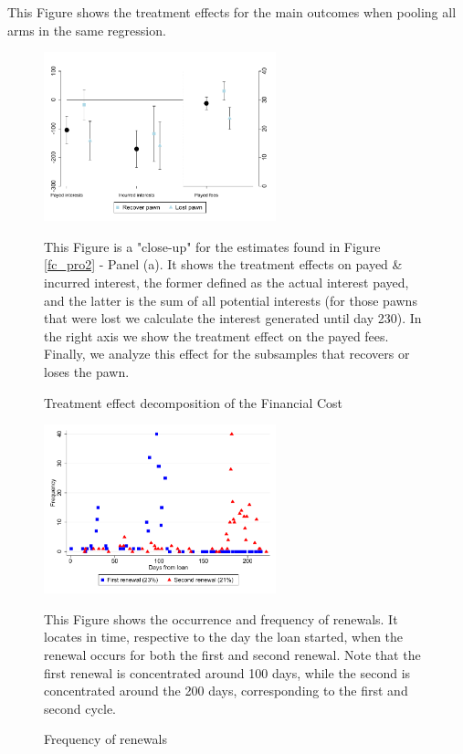 \documentclass[oneside,11pt]{article}
\begin{document}
\scriptsize {
\noindent This Figure shows the treatment effects for the main outcomes when pooling all arms in the same regression.
}

\begin{figure}[H]
        \caption{Treatment effect decomposition of the Financial Cost }
    \label{reg_int_pro_2}
    \begin{center}
        \centering
        \includegraphics[width=0.60\textwidth]{Figuras/int_te_pro_2.pdf}
    \end{center}
     \scriptsize This Figure is a "close-up" for the estimates found in Figure \ref{fc_pro2} - Panel (a). It shows the treatment effects on payed \& incurred interest, the former defined as the actual interest payed, and the latter is the sum of all potential interests (for those pawns that were lost we calculate the interest generated until day 230). In the right axis we show the treatment effect on the payed fees. Finally, we analyze this effect for the subsamples that recovers or loses the pawn.
\end{figure}


\begin{figure}[H]
        \caption{Frequency of renewals}
    \label{ref_dist}
    \begin{center}
        \centering
        \includegraphics[width=0.60\textwidth]{Figuras/ref_dist.pdf}
    \end{center}
     \scriptsize  This Figure shows the occurrence and frequency of renewals. It locates in time, respective to the day the loan started, when the renewal occurs for both the first and second renewal. Note that the first renewal is concentrated around 100 days, while the second is concentrated around the 200 days, corresponding to the first and second cycle. 
\end{figure}
\end{document}
